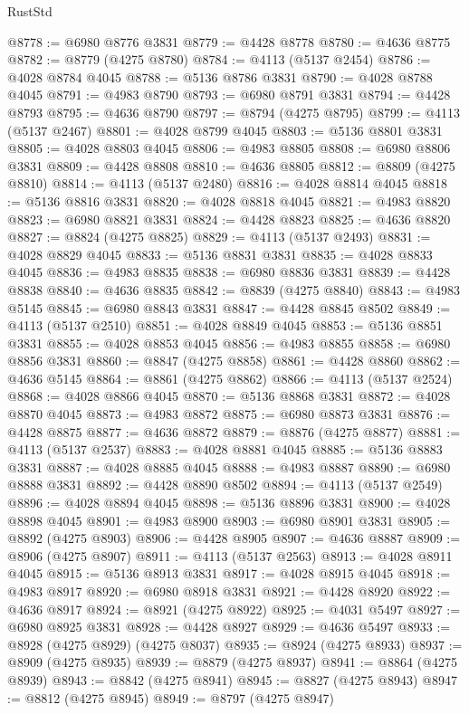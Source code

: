 \begin{lexlean}{RustStd}
\begin{coremodule}
@8778 := @6980 @8776 @3831
@8779 := @4428 @8778
@8780 := @4636 @8775
@8782 := @8779 (@4275 @8780)
@8784 := @4113 (@5137 @2454)
@8786 := @4028 @8784 @4045
@8788 := @5136 @8786 @3831
@8790 := @4028 @8788 @4045
@8791 := @4983 @8790
@8793 := @6980 @8791 @3831
@8794 := @4428 @8793
@8795 := @4636 @8790
@8797 := @8794 (@4275 @8795)
@8799 := @4113 (@5137 @2467)
@8801 := @4028 @8799 @4045
@8803 := @5136 @8801 @3831
@8805 := @4028 @8803 @4045
@8806 := @4983 @8805
@8808 := @6980 @8806 @3831
@8809 := @4428 @8808
@8810 := @4636 @8805
@8812 := @8809 (@4275 @8810)
@8814 := @4113 (@5137 @2480)
@8816 := @4028 @8814 @4045
@8818 := @5136 @8816 @3831
@8820 := @4028 @8818 @4045
@8821 := @4983 @8820
@8823 := @6980 @8821 @3831
@8824 := @4428 @8823
@8825 := @4636 @8820
@8827 := @8824 (@4275 @8825)
@8829 := @4113 (@5137 @2493)
@8831 := @4028 @8829 @4045
@8833 := @5136 @8831 @3831
@8835 := @4028 @8833 @4045
@8836 := @4983 @8835
@8838 := @6980 @8836 @3831
@8839 := @4428 @8838
@8840 := @4636 @8835
@8842 := @8839 (@4275 @8840)
@8843 := @4983 @5145
@8845 := @6980 @8843 @3831
@8847 := @4428 @8845 @8502
@8849 := @4113 (@5137 @2510)
@8851 := @4028 @8849 @4045
@8853 := @5136 @8851 @3831
@8855 := @4028 @8853 @4045
@8856 := @4983 @8855
@8858 := @6980 @8856 @3831
@8860 := @8847 (@4275 @8858)
@8861 := @4428 @8860
@8862 := @4636 @5145
@8864 := @8861 (@4275 @8862)
@8866 := @4113 (@5137 @2524)
@8868 := @4028 @8866 @4045
@8870 := @5136 @8868 @3831
@8872 := @4028 @8870 @4045
@8873 := @4983 @8872
@8875 := @6980 @8873 @3831
@8876 := @4428 @8875
@8877 := @4636 @8872
@8879 := @8876 (@4275 @8877)
@8881 := @4113 (@5137 @2537)
@8883 := @4028 @8881 @4045
@8885 := @5136 @8883 @3831
@8887 := @4028 @8885 @4045
@8888 := @4983 @8887
@8890 := @6980 @8888 @3831
@8892 := @4428 @8890 @8502
@8894 := @4113 (@5137 @2549)
@8896 := @4028 @8894 @4045
@8898 := @5136 @8896 @3831
@8900 := @4028 @8898 @4045
@8901 := @4983 @8900
@8903 := @6980 @8901 @3831
@8905 := @8892 (@4275 @8903)
@8906 := @4428 @8905
@8907 := @4636 @8887
@8909 := @8906 (@4275 @8907)
@8911 := @4113 (@5137 @2563)
@8913 := @4028 @8911 @4045
@8915 := @5136 @8913 @3831
@8917 := @4028 @8915 @4045
@8918 := @4983 @8917
@8920 := @6980 @8918 @3831
@8921 := @4428 @8920
@8922 := @4636 @8917
@8924 := @8921 (@4275 @8922)
@8925 := @4031 @5497
@8927 := @6980 @8925 @3831
@8928 := @4428 @8927
@8929 := @4636 @5497
@8933 := @8928 (@4275 @8929) (@4275 @8037)
@8935 := @8924 (@4275 @8933)
@8937 := @8909 (@4275 @8935)
@8939 := @8879 (@4275 @8937)
@8941 := @8864 (@4275 @8939)
@8943 := @8842 (@4275 @8941)
@8945 := @8827 (@4275 @8943)
@8947 := @8812 (@4275 @8945)
@8949 := @8797 (@4275 @8947)

\end{coremodule}
\end{lexlean}
